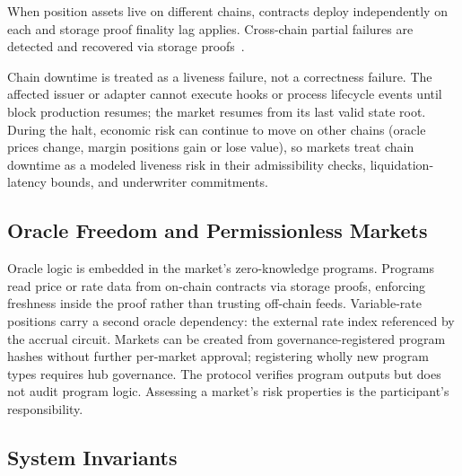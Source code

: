 When position assets live on different chains, contracts deploy independently on each and storage proof finality lag applies. Cross-chain partial failures are detected and recovered via storage proofs~\cite{daloc-decent2026}.

Chain downtime is treated as a liveness failure, not a correctness failure. The affected issuer or adapter cannot execute hooks or process lifecycle events until block production resumes; the market resumes from its last valid state root. During the halt, economic risk can continue to move on other chains (oracle prices change, margin positions gain or lose value), so markets treat chain downtime as a modeled liveness risk in their admissibility checks, liquidation-latency bounds, and underwriter commitments.

\subsection{Oracle Freedom and Permissionless Markets}

Oracle logic is embedded in the market's zero-knowledge programs. Programs read price or rate data from on-chain contracts via storage proofs, enforcing freshness inside the proof rather than trusting off-chain feeds. Variable-rate positions carry a second oracle dependency: the external rate index referenced by the accrual circuit. Markets can be created from governance-registered program hashes without further per-market approval; registering wholly new program types requires hub governance. The protocol verifies program outputs but does not audit program logic. Assessing a market's risk properties is the participant's responsibility.

\subsection{System Invariants}

